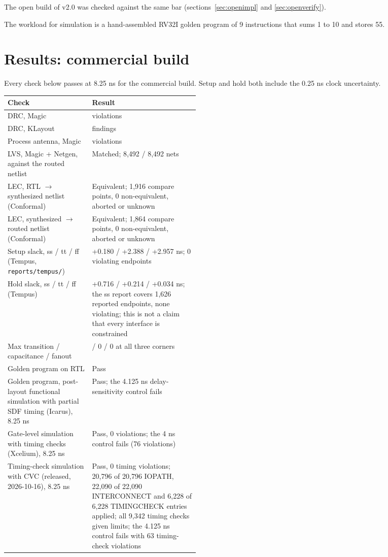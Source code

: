 \documentclass[11pt,letterpaper]{article}
\newcommand{\sk}[1]{\texttt{#1}}
\renewcommand{\_}{\textunderscore\penalty0\hskip0pt\relax}
\begin{document}
The open build of v2.0 was checked against the same bar (sections~\ref{sec:openimpl} and \ref{sec:openverify}).

The workload for simulation is a hand-assembled RV32I golden program of 9 instructions that sums 1 to 10 and stores 55.

\section{Results: commercial build}\label{sec:results}
Every check below passes at 8.25 ns for the commercial build. Setup and hold both include the 0.25 ns clock uncertainty.

\begin{center}
\small
\begin{tabularx}{\linewidth}{@{}>{\raggedright\arraybackslash}p{0.44\linewidth}>{\raggedright\arraybackslash}X@{}}
\toprule
Check & Result\\
\midrule
DRC, Magic & 0 violations\\
DRC, KLayout & 0 findings\\
Process antenna, Magic & 0 violations\\
LVS, Magic + Netgen, against the routed netlist & Matched; 8,492 / 8,492 nets\\
LEC, RTL $\to$ synthesized netlist (Conformal) & Equivalent; 1,916 compare points, 0 non-equivalent, aborted or unknown\\
LEC, synthesized $\to$ routed netlist (Conformal) & Equivalent; 1,864 compare points, 0 non-equivalent, aborted or unknown\\
Setup slack, ss / tt / ff (Tempus, \sk{reports/tempus/}) & +0.180 / +2.388 / +2.957 ns; 0 violating endpoints\\
Hold slack, ss / tt / ff (Tempus) & +0.716 / +0.214 / +0.034 ns; the ss report covers 1,626 reported endpoints, none violating; this is not a claim that every interface is constrained\\
Max transition / capacitance / fanout & 0 / 0 / 0 at all three corners\\
Golden program on RTL & Pass\\
Golden program, post-layout functional simulation with partial SDF timing (Icarus), 8.25 ns & Pass; the 4.125 ns delay-sensitivity control fails\\
Gate-level simulation with timing checks (Xcelium), 8.25 ns & Pass, 0 violations; the 4 ns control fails (76 violations)\\
Timing-check simulation with CVC (released, 2026-10-16), 8.25 ns & Pass, 0 timing violations; 20,796 of 20,796 IOPATH, 22,090 of 22,090 INTERCONNECT and 6,228 of 6,228 TIMINGCHECK entries applied; all 9,342 timing checks given limits; the 4.125 ns control fails with 63 timing-check violations\\

\end{tabularx}
\end{center}
\end{document}
